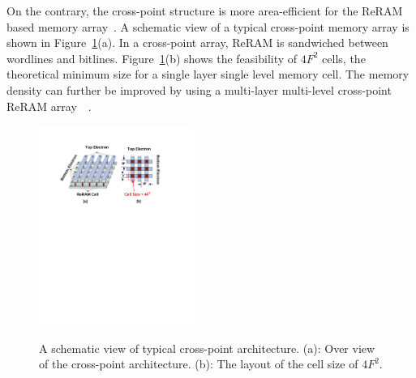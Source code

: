 On the contrary, the cross-point structure is more area-efficient for the ReRAM based memory array~\cite{memristor:Cong}. A schematic view of a typical cross-point memory array is shown in Figure~\ref{fig:array}(a). In a cross-point array, ReRAM is sandwiched between wordlines and bitlines. Figure~\ref{fig:array}(b) shows the feasibility of $4F^2$ cells, the theoretical minimum size for a single layer single level memory cell.
The memory density can further be improved by using a multi-layer multi-level cross-point ReRAM array~\cite{ReRAM_ISSCC2011_Sheu}~\cite{memristor:IEDM08_3D}.

\begin{figure}
\centering
  \includegraphics[width=0.45\textwidth]{./figures/crossbar_array2.pdf}\\\vspace{-10pt}
  \caption{A schematic view of typical cross-point architecture. (a): Over view of the cross-point architecture. (b): The layout of the cell size of $4F^2$. }\label{fig:array}
\vspace{-12pt}
\end{figure}

